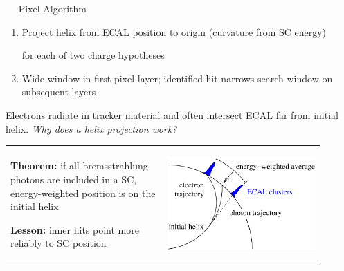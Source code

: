 \documentclass[landscape]{article}
\newenvironment{slide}[1][ ]{\mbox{\bf #1 } \vfill}{\vfill \mbox{ } \hfill \Large \arabic{page} \pagebreak}
\begin{document}
\begin{slide}
Pixel Algorithm

\vspace{0.5 cm}
\begin{enumerate}

\item Project helix from ECAL position to origin (curvature from SC energy)

for each of two charge hypotheses

\item Wide window in first pixel layer; identified hit narrows search
window on subsequent layers

\end{enumerate}

\vspace{0.5 cm}
Electrons radiate in tracker material and often intersect ECAL far
from initial helix.  {\it Why does a helix projection work?}

\vspace{0.5 cm}
\begin{center}
\begin{tabular}{p{0.45\linewidth} p{0.45\linewidth}}
\begin{minipage}{\linewidth}
{\bf Theorem:} if all bremsstrahlung photons are included in a SC,
energy-weighted position is on the initial helix

\vspace{0.5 cm}
{\bf Lesson:} inner hits point more reliably to SC position

\end{minipage} &
\begin{minipage}{\linewidth}
\begin{center}
\mbox{\hspace{1 cm}} \includegraphics[width=\linewidth]{theorem} \mbox{\hspace{-1 cm}}
\end{center}
\end{minipage}
\end{tabular}
\end{center}
\end{slide}
\end{document}
